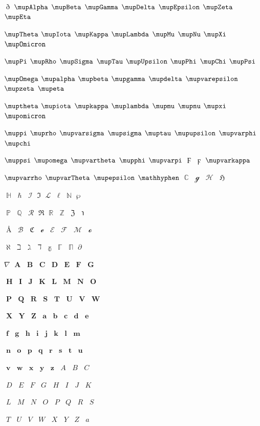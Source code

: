 \documentclass{article}
\begin{document}
$\matheth$ $\mupAlpha$ $\mupBeta$ $\mupGamma$ $\mupDelta$ $\mupEpsilon$ $\mupZeta$ $\mupEta$ \par
$\mupTheta$ $\mupIota$ $\mupKappa$ $\mupLambda$ $\mupMu$ $\mupNu$ $\mupXi$ $\mupOmicron$ \par
$\mupPi$ $\mupRho$ $\mupSigma$ $\mupTau$ $\mupUpsilon$ $\mupPhi$ $\mupChi$ $\mupPsi$ \par
$\mupOmega$ $\mupalpha$ $\mupbeta$ $\mupgamma$ $\mupdelta$ $\mupvarepsilon$ $\mupzeta$ $\mupeta$ \par
$\muptheta$ $\mupiota$ $\mupkappa$ $\muplambda$ $\mupmu$ $\mupnu$ $\mupxi$ $\mupomicron$ \par
$\muppi$ $\muprho$ $\mupvarsigma$ $\mupsigma$ $\muptau$ $\mupupsilon$ $\mupvarphi$ $\mupchi$ \par
$\muppsi$ $\mupomega$ $\mupvartheta$ $\mupphi$ $\mupvarpi$ $\upDigamma$ $\updigamma$ $\mupvarkappa$ \par
$\mupvarrho$ $\mupvarTheta$ $\mupepsilon$ $\mathhyphen$ $\BbbC$ $\mscrg$ $\mscrH$ $\mfrakH$ \par
$\BbbH$ $\hslash$ $\mscrI$ $\Im$ $\mscrL$ $\ell$ $\BbbN$ $\wp$ \par
$\BbbP$ $\BbbQ$ $\mscrR$ $\Re$ $\BbbR$ $\BbbZ$ $\mfrakZ$ $\turnediota$ \par
$\Angstrom$ $\mscrB$ $\mfrakC$ $\mscre$ $\mscrE$ $\mscrF$ $\mscrM$ $\mscro$ \par
$\aleph$ $\beth$ $\gimel$ $\daleth$ $\Bbbgamma$ $\BbbGamma$ $\BbbPi$ $\partial$ \par
$\nabla$ $\mbfA$ $\mbfB$ $\mbfC$ $\mbfD$ $\mbfE$ $\mbfF$ $\mbfG$ \par
$\mbfH$ $\mbfI$ $\mbfJ$ $\mbfK$ $\mbfL$ $\mbfM$ $\mbfN$ $\mbfO$ \par
$\mbfP$ $\mbfQ$ $\mbfR$ $\mbfS$ $\mbfT$ $\mbfU$ $\mbfV$ $\mbfW$ \par
$\mbfX$ $\mbfY$ $\mbfZ$ $\mbfa$ $\mbfb$ $\mbfc$ $\mbfd$ $\mbfe$ \par
$\mbff$ $\mbfg$ $\mbfh$ $\mbfi$ $\mbfj$ $\mbfk$ $\mbfl$ $\mbfm$ \par
$\mbfn$ $\mbfo$ $\mbfp$ $\mbfq$ $\mbfr$ $\mbfs$ $\mbft$ $\mbfu$ \par
$\mbfv$ $\mbfw$ $\mbfx$ $\mbfy$ $\mbfz$ $\mitA$ $\mitB$ $\mitC$ \par
$\mitD$ $\mitE$ $\mitF$ $\mitG$ $\mitH$ $\mitI$ $\mitJ$ $\mitK$ \par
$\mitL$ $\mitM$ $\mitN$ $\mitO$ $\mitP$ $\mitQ$ $\mitR$ $\mitS$ \par
$\mitT$ $\mitU$ $\mitV$ $\mitW$ $\mitX$ $\mitY$ $\mitZ$ $\mita$ \par
\end{document}
